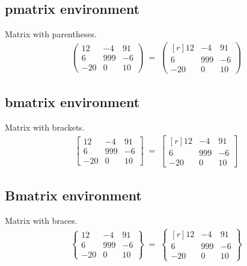 \documentclass[11pt,a4paper]{report}
\theoremstyle{remark}
\theoremstyle{definition}
\begin{document}
			\subsection*{pmatrix environment}
			
				\noindent
				Matrix with parentheses.
				\begin{align*}
					\begin{pmatrix}
						12 & -4 & 91
					\\
						6 & 999 & -6
					\\
						-20 & 0 & 10
					\end{pmatrix}
					\;=\;
					\begin{pmatrix*}[r]
						12 & -4 & 91
					\\
						6 & 999 & -6
					\\
						-20 & 0 & 10
					\end{pmatrix*}
				\end{align*}
				
			\subsection*{bmatrix environment}
			
				\noindent
				Matrix with brackets.
				\begin{align*}
					\begin{bmatrix}
						12 & -4 & 91
					\\
						6 & 999 & -6
					\\
						-20 & 0 & 10
					\end{bmatrix}
					\;=\;
					\begin{bmatrix*}[r]
						12 & -4 & 91
					\\
						6 & 999 & -6
					\\
						-20 & 0 & 10
					\end{bmatrix*}
				\end{align*}
			
			\subsection*{Bmatrix environment}
			
				\noindent
				Matrix with braces.
				\begin{align*}
					\begin{Bmatrix}
						12 & -4 & 91
					\\
						6 & 999 & -6
					\\
						-20 & 0 & 10
					\end{Bmatrix}
					\;=\;
					\begin{Bmatrix*}[r]
						12 & -4 & 91
					\\
						6 & 999 & -6
					\\
						-20 & 0 & 10
					\end{Bmatrix*}
				\end{align*}
			
\end{document}
